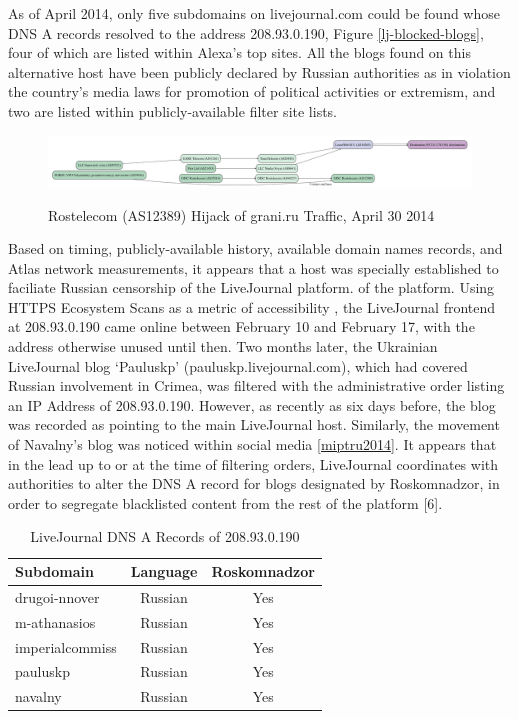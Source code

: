 As of April 2014, only five subdomains on livejournal.com could be found whose
DNS A records resolved to the address 208.93.0.190, Figure
\ref{lj-blocked-blogs}, four of which are listed within Alexa's top sites. All
the blogs found on this alternative host have been publicly declared by Russian
authorities as in violation the country's media laws for promotion of political
activities or extremism, and two are listed within publicly-available filter
site lists. 

\begin{figure}
  \includegraphics[width=\textwidth]{resources/atlas_cache-results-measurement_id-1663748.png}
  \label{image:ru-grani-hijack}
  \caption{Rostelecom (AS12389) Hijack of grani.ru Traffic, April 30 2014}
\end{figure}

Based on timing, publicly-available history, available domain names records,
and Atlas network measurements, it appears that a host was specially
established to faciliate Russian censorship of the LiveJournal platform.
of the platform. Using HTTPS Ecosystem Scans as a metric of accessibility
\cite{projectsonar}, the LiveJournal frontend at 208.93.0.190 came online
between February 10 and February 17, with the address otherwise unused until
then. Two months later, the Ukrainian LiveJournal blog `Pauluskp'
(pauluskp.livejournal.com), which had covered Russian involvement in Crimea,
was filtered with the administrative order listing an IP Address of
208.93.0.190. However, as recently as six days before, the blog was recorded as
pointing to the main LiveJournal host. Similarly, the movement of Navalny's
blog was noticed within social media \ref{miptru2014}. It appears that in the
lead up to or at the time of filtering orders, LiveJournal coordinates with
authorities to alter the DNS A record for blogs designated by Roskomnadzor, in
order to segregate blacklisted content from the rest of the platform [6].

\begin{table}
    \begin{tabular}{| l | c | c |}
        \hline
        Subdomain & Language & Roskomnadzor\\
        \hline
        drugoi-nnover & Russian & Yes\\
        m-athanasios & Russian & Yes\\
        imperialcommiss & Russian & Yes\\
        pauluskp & Russian & Yes \\
        navalny & Russian & Yes \\
        \hline
    \end{tabular}
    \label{table:lj-blocked-blogs}
    \caption{LiveJournal DNS A Records of 208.93.0.190}
\end{table}

